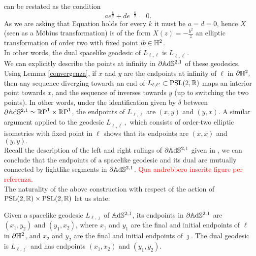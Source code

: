 can be restated as the condition \begin{equation}\label{ellittichine} 
    ae^{\frac{k}{2}}+de^{-\frac{k}{2}}=0.
\end{equation}
As we are asking that Equation  holds for every $k$ it must be $a=d=0$, hence $X$ (seen as a Möbius transformation) is of the form $X(z)=-\frac{b^2}{z}$ an elliptic transformation of order two with fixed point $ib\in \mathbb{H}^2$.\\
In other words, the dual spacelike geodesic of $L_{\ell,\ell}$ is $L_{\ell,\ell^{\prime}}.$\\
We can explicitly describe the points at infinity in $\partial\mathbb{A}\mathrm{d}\mathbb{S}^{2,1}$ of these geodesics. Using Lemma \ref{convergenza}, if $x$ and $y$ are the endpoints at infinity of $\ell$ in $\partial\mathbb{H}^2,$ then any sequence diverging towards an end of $L_{\ell,\ell^{\prime}}\subset \text{PSL}(2,\mathbb{R})$ maps an interior point towards $x$, and the sequence of inverses towards $y$ (up to switching the two points). In other words, under the identification given by $\delta$ between $\partial\mathbb{A}\mathrm{d}\mathbb{S}^{2,1}\simeq\mathbb{R}\text{P}^1\times\mathbb{R}\text{P}^1$, the endpoints of $L_{\ell,\ell}$ are $(x,y)$ and $(y,x)$. A similar argument applied to the geodesic $L_{\ell,\ell^{\prime} },$ which consists of order-two elliptic isometries with fixed point in $\ell$ shows that its endpoints are $(x,x)$ and $(y,y).$\\
Recall the description of the left and right rulings of $\partial\mathbb{A}\mathrm{d}\mathbb{S}^{2,1}$ given in , we can conclude that the endpoints of a spacelike geodesic and its dual are mutually connected by lightlike segments in $\partial\mathbb{A}\mathrm{d}\mathbb{S}^{2,1}$. \textcolor{red}{Qua andrebbero inserite figure per referenza.}\\
The naturality of the above construction with respect of the action of $\text{PSL}(2,\mathbb{R})\times\text{PSL}(2,\mathbb{R})$ let us state: 
\begin{proposition}
    Given a spacelike geodesic $L_{\ell,\jmath}$ of $\mathbb{A}\mathrm{d}\mathbb{S}^{2,1}$, its endpoints in $\partial \mathbb{A}\mathrm{d}\mathbb{S}^{2.1}$ are $(x_1,y_2)$ and $(y_1,x_2)$, where $x_1$ and $y_1$ are the final and initial endpoints of $\ell$ in $\partial\mathbb{H}^2$, and $x_2$ and $y_2$ are the final and initial endpoints of $\jmath$. The dual geodesic is $L_{\ell,\jmath^{\prime}}$ and has endpoints $(x_1,x_2)$ and $(y_1,y_2).$
\end{proposition}



